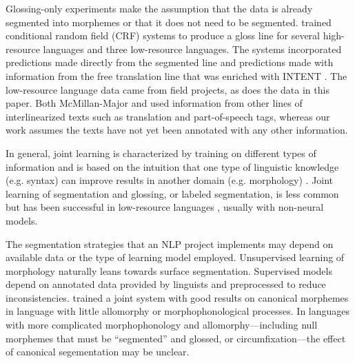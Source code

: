 Glossing-only experiments make the assumption that the data is already segmented into morphemes or that it does not need to be segmented. 
\citet{mcmillan-major_automating_2020} trained conditional random field (CRF) systems to produce a gloss line for several high-resource languages and three low-resource languages. The systems incorporated predictions made directly from the segmented line and predictions made with information from the free translation line that was enriched with INTENT \cite{georgi_aari_2016}. The low-resource language data came from field projects, as does the data in this paper. Both McMillan-Major and \citet{samardzic_automatic_2015} used information from other lines of interlinearized texts such as translation and part-of-speech tags, whereas our work assumes the texts have not yet been annotated with any other information.

In general, joint learning is characterized by training on different types of information and is based on the intuition that one type of linguistic knowledge (e.g. syntax) can improve results in another domain (e.g. morphology) \cite{goldsmith_computational_2017}. Joint learning of segmentation and glossing, or labeled segmentation, is less common but has been successful in low-resource languages  \cite{cotterell_labeled_2015,moeller_automatic_2018}, usually with non-neural models. 
 
The segmentation strategies that an NLP project implements may depend on available data or the type of learning model employed. Unsupervised learning of morphology naturally leans towards surface segmentation. Supervised models depend on annotated data provided by linguists and preprocessed to reduce inconsistencies. \citet{moeller_automatic_2018} trained a joint system with good results on canonical morphemes in language with little allomorphy or morphophonological processes.
In languages with more complicated morphophonology and allomorphy---including null morphemes that must be ``segmented'' and glossed, or circumfixation---the effect of canonical segementation may be unclear.


